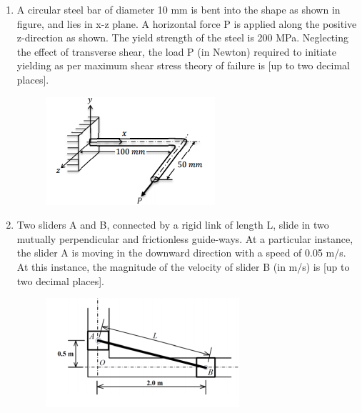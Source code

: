 \documentclass[a4paper,10pt]{article}
\begin{document}
\begin{enumerate}
    \item A circular steel bar of diameter 10 mm is bent into the shape as shown in figure, and lies in x-z plane. A horizontal force P is applied along the positive z-direction as shown. The yield strength of the steel is 200 MPa. Neglecting the effect of transverse shear, the load P (in Newton) required to initiate yielding as per maximum shear stress theory of failure is \underline{\hspace{2cm}} [up to two decimal places].
    \begin{figure}[H] \centering \includegraphics[width=0.5\columnwidth]{q17_solid.png} \caption*{} \label{fig:q17_solid} \end{figure}
    \hfill{}

    \item Two sliders A and B, connected by a rigid link of length L, slide in two mutually perpendicular and frictionless guide-ways. At a particular instance, the slider A is moving in the downward direction with a speed of 0.05 m/s. At this instance, the magnitude of the velocity of slider B (in m/s) is \underline{\hspace{2cm}} [up to two decimal places].
    \begin{figure}[H] \centering \includegraphics[width=0.6\columnwidth]{q18_solid.png} \caption*{} \label{fig:q18_solid} \end{figure}
    \hfill{}


\end{enumerate}
\end{document}
